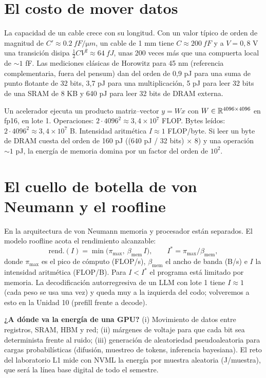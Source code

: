 \documentclass[11pt,a4paper]{article}
\begin{document}
\section{El costo de mover datos}
La capacidad de un cable crece con su longitud. Con un valor típico de orden de magnitud \evE{} de
$C'\approx\SI{0.2}{fF/\micro m}$, un cable de 1 mm tiene $C\approx\SI{200}{fF}$ y a $V=0{,}8$ V una
transición disipa $\tfrac12CV^2\approx\SI{64}{fJ}$, unas 200 veces más que una compuerta local de
$\sim1$ fF. Las mediciones clásicas de Horowitz para 45 nm (referencia complementaria, fuera del pensum)
dan del orden de 0,9 pJ para una suma de punto flotante de 32 bits, 3,7 pJ para una multiplicación,
5 pJ para leer 32 bits de una SRAM de 8 KB y 640 pJ para leer 32 bits de DRAM externa.
\begin{ejemplo}
Un acelerador ejecuta un producto matriz--vector $y=Wx$ con $W\in\mathbb{R}^{4096\times4096}$ en fp16, en lote 1.
Operaciones: $2\cdot4096^2\approx3{,}4\times10^7$ FLOP. Bytes leídos: $2\cdot4096^2\approx3{,}4\times10^7$ B.
Intensidad aritmética $I\approx1$ FLOP/byte. Si leer un byte de DRAM cuesta del orden de 160 pJ ((640 pJ / 32 bits) $\times$ 8) y una operación
$\sim1$ pJ, la energía de memoria domina por un factor del orden de $10^2$.
\end{ejemplo}

\section{El cuello de botella de von Neumann y el roofline}
En la arquitectura de von Neumann memoria y procesador están separados. El modelo roofline acota el
rendimiento alcanzable:
\begin{equation}\text{rend.}(I)=\min\bigl(\pi_{\max},\ \beta_{\text{mem}}\,I\bigr),\qquad I^*=\pi_{\max}/\beta_{\text{mem}},\end{equation}
donde $\pi_{\max}$ es el pico de cómputo (FLOP/s), $\beta_{\text{mem}}$ el ancho de banda (B/s) e $I$ la
intensidad aritmética (FLOP/B). Para $I<I^*$ el programa está limitado por memoria. La decodificación
autorregresiva de un LLM con lote 1 tiene $I\approx1$ (cada peso se usa una vez) y queda muy a la
izquierda del codo; volveremos a esto en la Unidad 10 (prefill frente a decode).

\begin{aplicacion}
\textbf{¿A dónde va la energía de una GPU?} (i) Movimiento de datos entre registros, SRAM, HBM y red;
(ii) márgenes de voltaje para que cada bit sea determinista frente al ruido; (iii) generación de
aleatoriedad pseudoaleatoria para cargas probabilísticas (difusión, muestreo de tokens, inferencia
bayesiana). El reto del laboratorio L1 mide con NVML la energía por muestra aleatoria (J/muestra), que
será la línea base digital de todo el semestre.
\end{aplicacion}
\end{document}
